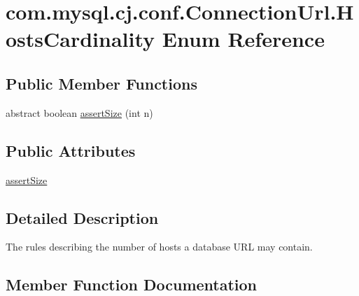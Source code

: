 \hypertarget{enumcom_1_1mysql_1_1cj_1_1conf_1_1_connection_url_1_1_hosts_cardinality}{}\section{com.\+mysql.\+cj.\+conf.\+Connection\+Url.\+Hosts\+Cardinality Enum Reference}
\label{enumcom_1_1mysql_1_1cj_1_1conf_1_1_connection_url_1_1_hosts_cardinality}
\subsection*{Public Member Functions}
\begin{DoxyCompactItemize}
\item 
abstract boolean \mbox{\hyperlink{enumcom_1_1mysql_1_1cj_1_1conf_1_1_connection_url_1_1_hosts_cardinality_ac284db6b3b9a93d35d400c1d05cfb717}{assert\+Size}} (int n)
\end{DoxyCompactItemize}
\subsection*{Public Attributes}
\begin{DoxyCompactItemize}
\item 
\mbox{\hyperlink{enumcom_1_1mysql_1_1cj_1_1conf_1_1_connection_url_1_1_hosts_cardinality_a841d1e01689174a7e5f02fe698ccbd5f}{assert\+Size}}
\end{DoxyCompactItemize}


\subsection{Detailed Description}
The rules describing the number of hosts a database U\+RL may contain. 

\subsection{Member Function Documentation}
\mbox{\label{enumcom_1_1mysql_1_1cj_1_1conf_1_1_connection_url_1_1_hosts_cardinality_ac284db6b3b9a93d35d400c1d05cfb717}} 
